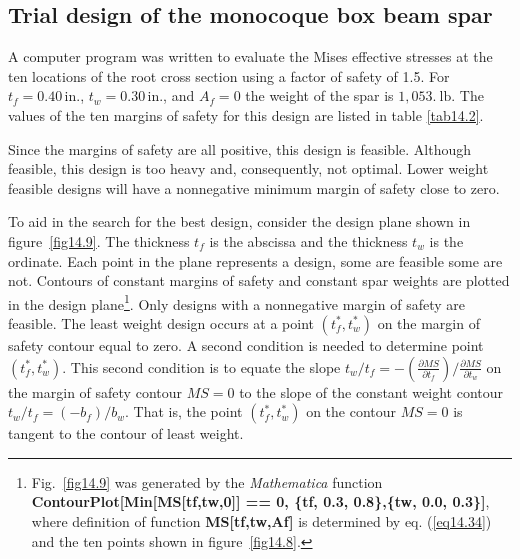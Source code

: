 \documentclass{AeroStructure-ERJohnson}
\begin{document}
\subsection{Trial design of the monocoque box beam spar}\label{sec14.2.2}
A computer program was written to evaluate the Mises effective stresses at the ten locations of the root cross section using a factor of safety of 1.5. For $t_{f}=0.40\,\mathrm{in.}$, $t_{w}=0.30\,\mathrm{in.}$, and $A_{f}=0$ the weight of the spar is $1{,}053.\mathrm{~lb.}$ The values of the ten margins of safety for this design are listed in table \ref{tab14.2}.

\begin{table}[h]
\vspace*{-18pt}
\end{table}

\noindent Since the margins of safety are all positive, this design is feasible. Although feasible, this design is too heavy and, consequently, not optimal. Lower weight feasible designs will have a nonnegative minimum margin of safety close to zero.

To aid in the search for the best design, consider the design plane shown in figure~\ref{fig14.9}. The thickness $t_f$ is the abscissa and the thickness $t_w$ is the ordinate. Each point in the plane represents a design, some are feasible some are not. Contours of constant margins of safety and constant spar weights are plotted in the design plane\footnote{Fig.~\ref{fig14.9} was generated by the \textit{Mathematica} function \textbf{ContourPlot[Min[MS[tf,tw,0]] == 0, \{tf, 0.3, 0.8\},\{tw, 0.0, 0.3\}]}, where definition of function \textbf{MS[tf,tw,Af]} is determined by eq. (\ref{eq14.34}) and the ten points shown in figure~\ref{fig14.8}.}. Only designs with a nonnegative margin of safety are feasible. The least weight design occurs at a point $\left(t_{f}^{*}, t_{w}^{*}\right)$ on the margin of safety contour equal to zero. A second condition is needed to determine point $\left(t_{f}^{*}, t_{w}^{*}\right)$. This second condition is to equate the slope $t_{w}/t_{f}=-\left(\frac{\partial M S}{\partial t_{f}}\right)/\frac{\partial M S}{\partial t_{w}}$ on the margin of safety contour $M S=0$ to the slope of the constant weight contour $t_{w}/t_{f}=(-b_{f})/b_{w}$. That is, the point $\left(t_{f}^{*}, t_{w}^{*}\right)$ on the contour $M S=0$ is tangent to the contour of least weight.
\end{document}

